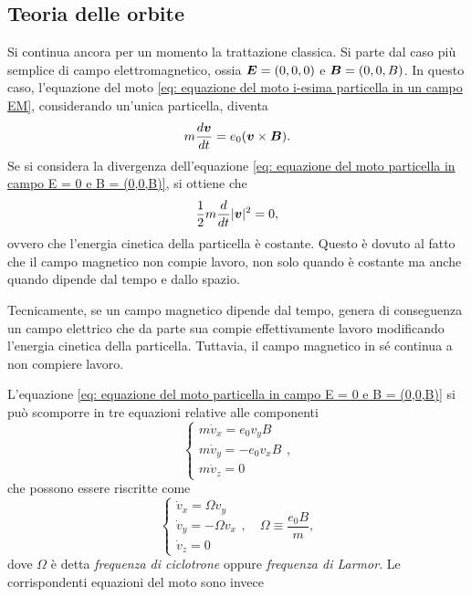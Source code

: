 \subsection{Teoria delle orbite}
Si continua ancora per un momento la trattazione classica. Si parte dal caso più semplice di campo elettromagnetico, ossia $\bm{E} = (0,0,0)$ e $\bm{B} = (0,0,B)$. In questo caso, l'equazione del moto \eqref{eq: equazione del moto i-esima particella in un campo EM}, considerando un'unica particella, diventa
\begin{equation}
\label{eq: equazione del moto particella in campo E = 0 e B = (0,0,B)}
    m\frac{d\bm{v}}{dt} = e_0(\bm{v} \times \bm{B}).
\end{equation}
Se si considera la divergenza dell'equazione \eqref{eq: equazione del moto particella in campo E = 0 e B = (0,0,B)}, si ottiene che 
\begin{equation}
    \frac{1}{2}m\dfrac{d}{dt}|\bm{v}|^2 = 0,
\end{equation}
ovvero che l'energia cinetica della particella è costante. Questo è dovuto al fatto che il campo magnetico non compie lavoro, non solo quando è costante ma anche quando dipende dal tempo e dallo spazio.
\begin{obs}
    Tecnicamente, se un campo magnetico dipende dal tempo, genera di conseguenza un campo elettrico che da parte sua compie effettivamente lavoro modificando l'energia cinetica della particella. Tuttavia, il campo magnetico in sé continua a non compiere lavoro.
\end{obs}
L'equazione \eqref{eq: equazione del moto particella in campo E = 0 e B = (0,0,B)} si può scomporre in tre equazioni relative alle componenti
\begin{equation}
    \begin{cases}
        m\dot{v}_x = e_0v_yB \\
        m\dot{v}_y = -e_0v_xB \\
        m\dot{v}_z = 0
    \end{cases},
\end{equation}
che possono essere riscritte come
\begin{equation}
    \begin{cases}
        \dot{v}_x = \Omega v_y \\
        \dot{v}_y = -\Omega v_x \\
        \dot{v}_z = 0
    \end{cases},\quad \Omega \equiv \frac{e_0B}{m},
\end{equation}
dove $\Omega$ è detta \emph{frequenza di ciclotrone} oppure \emph{frequenza di Larmor}. Le corrispondenti equazioni del moto sono invece
